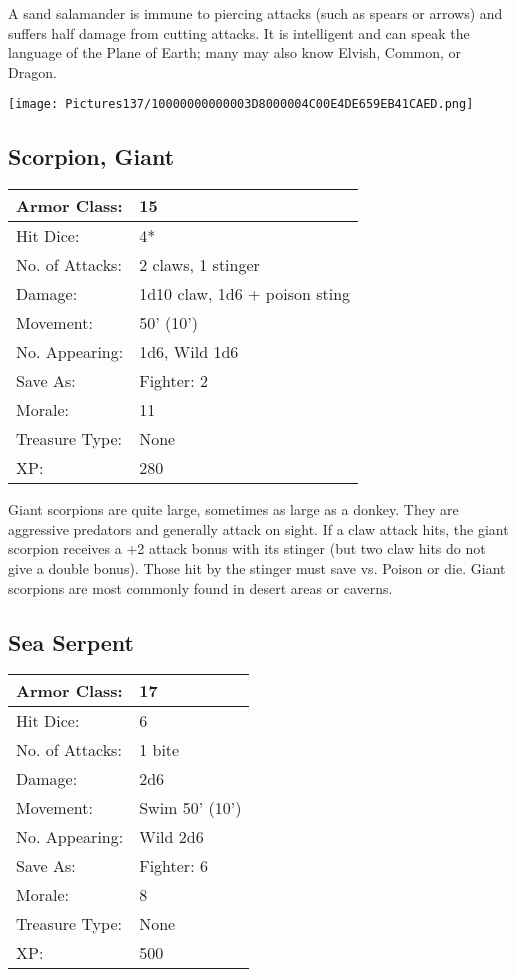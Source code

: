 \documentclass[a4paper,twoside,openany,10pt]{book}
\begin{document}
\begin{multicols}{2}
A sand salamander is immune to piercing attacks (such as spears or arrows) and suffers half damage from cutting attacks. It is intelligent and can speak the language of the Plane of Earth; many may also know Elvish, Common, or Dragon.

\begin{center} \texttt{[image: Pictures137/10000000000003D8000004C00E4DE659EB41CAED.png]} \end{center}


\subsection*{Scorpion, Giant}\label{scorpion-giant}

\begin{tabularx}{0.50\textwidth}{@{}lX@{}}
Armor Class: & 15 \\\hline
Hit Dice: & 4* \\\hline
No. of Attacks: & 2 claws, 1 stinger \\\hline
Damage: & 1d10 claw, 1d6 + poison sting \\\hline
Movement: & 50' (10') \\\hline
No. Appearing: & 1d6, Wild 1d6 \\\hline
Save As: & Fighter: 2 \\\hline
Morale: & 11 \\\hline
Treasure Type: & None \\\hline
XP: & 280 \\\hline
\end{tabularx}\medskip

Giant scorpions are quite large, sometimes as large as a donkey. They are aggressive predators and generally attack on sight. If a claw attack hits, the giant scorpion receives a +2 attack bonus with its stinger (but two claw hits do not give a double bonus). Those hit by the stinger must save vs. Poison or die. Giant scorpions are most commonly found in desert areas or caverns.

\subsection*{Sea Serpent}\label{sea-serpent}

\begin{tabularx}{0.50\textwidth}{@{}lX@{}}
Armor Class: & 17 \\\hline
Hit Dice: & 6 \\\hline
No. of Attacks: & 1 bite \\\hline
Damage: & 2d6 \\\hline
Movement: & Swim 50' (10') \\\hline
No. Appearing: & Wild 2d6 \\\hline
Save As: & Fighter: 6 \\\hline
Morale: & 8 \\\hline
Treasure Type: & None \\\hline
XP: & 500 \\\hline
\end{tabularx}\medskip


\end{multicols}
\end{document}
